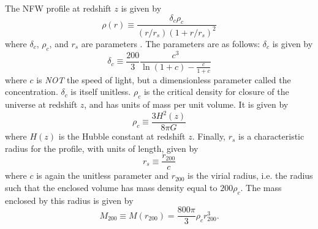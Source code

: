 \documentclass[10pt,twoside]{article}
\theoremstyle{definition}
\theoremstyle{exercise}
\begin{document}
The NFW profile at redshift $z$ is given by \cite{brainerd_wright}
\begin{equation}
		\rho(r) \equiv \frac{\delta_c \rho_c}{(r/r_s)(1+r/r_s)^2}
		\label{eq:NFW_profile}
\end{equation}
where $\delta_c$, $\rho_c$, and $r_s$ are parameters \cite{brainerd_wright}. The parameters are as follows:
 $\delta_c$ is given by
\begin{equation}
		\delta_c \equiv \frac{200}{3} \frac{c^3}{\ln(1+c) - \frac{c}{1+c}}
		\label{eq:delta_c}
\end{equation}
where $c$ is \emph{NOT} the speed of light, but a dimensionless parameter called the concentration. $\delta_c$ is itself unitless. $\rho_c$ is the critical density for closure of the universe at redshift $z$, and has units of mass per unit volume. It is given by
\begin{equation}
		\rho_c \equiv \frac{3H^2(z)}{8\pi G}
		\label{eq:rho_c}
\end{equation}
where $H(z)$ is the Hubble constant at redshift $z$. Finally, $r_s$ is a characteristic radius for the profile, with units of length, given by
\begin{equation}
		r_s \equiv \frac{r_{200}}{c}
		\label{eq:r_s}
\end{equation}
where $c$ is again the unitless parameter and $r_{200}$ is the virial radius, i.e. the radius such that the enclosed volume has mass density equal to $200 \rho_c$. The mass enclosed by this radius is given by 
\begin{equation}
		M_{200} \equiv M(r_{200}) = \frac{800 \pi}{3} \rho_c r_{200}^3.
		\label{eq:m_200}
\end{equation}
\end{document}
